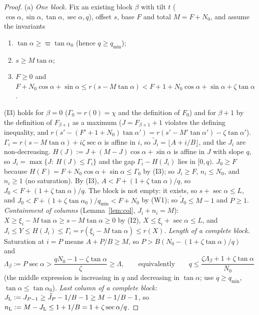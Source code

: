 \documentclass[11pt]{amsart}
\newcommand{\ca}{\cos\alpha}
\newcommand{\sa}{\sin\alpha}
\newcommand{\ta}{\tan\alpha}
\newcommand{\se}{\sec\alpha}
\newcommand{\taz}{\tan\alpha_0}
\theoremstyle{definition}
\theoremstyle{remark}
\numberwithin{equation}{section}
\begin{document}
\begin{proof}
(a) \emph{One block.} Fix an existing block $\beta$ with tilt $t$ ($\ca,\sa,\ta,\se,q$), offset $s$, base $F$ and total
$M=F+N_0$, and assume the invariants
\begin{enumerate}[label=(I\arabic*)]
\item $\ta\ge\varpi\taz$ (hence $q\ge q_{\min}$);
\item $s\ge M\ta$;
\item $F\ge0$ and $F+N_0\ca+\sa\le r(s-M\ta)<F+1+N_0\ca+\sa+\zeta\ta$.
\end{enumerate}
(I3) holds for $\beta=0$ ($\Gamma_0=r(0)=\chi$ and the definition of $F_0$) and for $\beta+1$ by the definition of
$F_{\beta+1}$ as a maximum ($J=F_{\beta+1}+1$ violates the defining inequality, and
$r(s'-(F'+1+N_0)\ta')=r(s'-M'\ta')-\zeta\ta'$).
$\Gamma_i=r(s-M\ta)+i\zeta\se$ is affine in $i$, so $\tilde J_i=\lfloor A+i/B\rfloor$, and the $J_i$ are non-decreasing.
$H(J):=J+(M-J)\ca+\sa$ is affine in $J$ with slope $q$, so $J_i=\max\{J:\ H(J)\le\Gamma_i\}$ and the gap
$\Gamma_i-H(J_i)$ lies in $[0,q)$. $J_0\ge F$ because $H(F)=F+N_0\ca+\sa\le\Gamma_0$ by (I3); so $J_i\ge F$,
$n_i\le N_0$, and $n_i\ge1$ (no saturation). By (I3), $A<F+(1+\zeta\ta)/q$, so $J_0<F+(1+\zeta\ta)/q$.
The block is not empty: it exists, so $s+\se\le L$, and $J_0<F+(1+\zeta\taz)/q_{\min}<F+N_0$ by (W1); so
$\tilde J_0\le M-1$ and $P\ge1$.
\emph{Containment of columns} (Lemma~\ref{lem:col}, $J_i+n_i=M$): $X\ge\xi_i-M\ta\ge s-M\ta\ge0$ by (I2),
$X\le\xi_i+\se\le L$, and $J_i\le Y\le H(J_i)\le\Gamma_i=r(\xi_i-M\ta)\le r(X)$.
\emph{Length of a complete block.} Saturation at $i=P$ means $A+P/B\ge M$, so $P>B(N_0-(1+\zeta\ta)/q)$ and
\begin{equation}\label{eq:L1}
\Lambda_\beta:=P\se>\frac{qN_0-1-\zeta\ta}{\zeta}\ge\Lambda,\qquad\text{equivalently}\qquad
q\le\frac{\zeta\Lambda_\beta+1+\zeta\ta}{N_0}
\end{equation}
(the middle expression is increasing in $q$ and decreasing in $\ta$; use $q\ge q_{\min}$, $\ta\le\taz$).
\emph{Last column of a complete block:} $J_{\rm L}:=J_{P-1}\ge\tilde J_P-1/B-1\ge M-1/B-1$, so
$n_{\rm L}:=M-J_{\rm L}\le1+1/B=1+\zeta\se/q$.


\end{proof}
\end{document}
